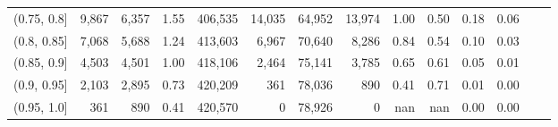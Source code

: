 \begin{tabular}{rrrrrrrrrrrrrr}
(0.75, 0.8]    &   9,867 &  6,357 &    1.55 &  406,535 &   14,035 &  64,952 &  13,974 &  1.00 &  0.50 &  0.18 &      0.06 \\
(0.8, 0.85]    &   7,068 &  5,688 &    1.24 &  413,603 &    6,967 &  70,640 &   8,286 &  0.84 &  0.54 &  0.10 &      0.03 \\
(0.85, 0.9]    &   4,503 &  4,501 &    1.00 &  418,106 &    2,464 &  75,141 &   3,785 &  0.65 &  0.61 &  0.05 &      0.01 \\
(0.9, 0.95]    &   2,103 &  2,895 &    0.73 &  420,209 &      361 &  78,036 &     890 &  0.41 &  0.71 &  0.01 &      0.00 \\
(0.95, 1.0]    &     361 &    890 &    0.41 &  420,570 &        0 &  78,926 &       0 &   nan &   nan &  0.00 &      0.00 \\
\bottomrule
\end{tabular}
